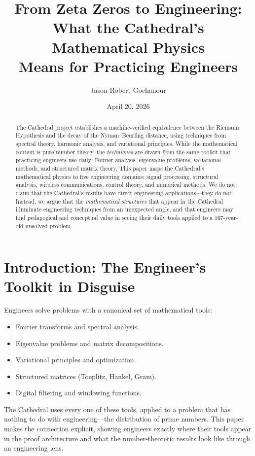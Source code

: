 \documentclass[11pt,a4paper]{article}
\title{%
  From Zeta Zeros to Engineering:\\
  What the Cathedral's Mathematical Physics\\
  Means for Practicing Engineers%
}
\author{
  Jason Robert Gochanour
}
\date{April 20, 2026}
\begin{document}
\maketitle

\begin{abstract}
The Cathedral project establishes a machine-verified equivalence
between the Riemann Hypothesis and the decay of the Nyman--Beurling
distance, using techniques from spectral theory, harmonic analysis,
and variational principles. While the mathematical content is pure
number theory, the \emph{techniques} are drawn from the same toolkit
that practicing engineers use daily: Fourier analysis, eigenvalue
problems, variational methods, and structured matrix theory. This
paper maps the Cathedral's mathematical physics to five engineering
domains: signal processing, structural analysis, wireless
communications, control theory, and numerical methods. We do not
claim that the Cathedral's results have direct engineering
applications---they do not. Instead, we argue that the
\emph{mathematical structures} that appear in the Cathedral
illuminate engineering techniques from an unexpected angle, and
that engineers may find pedagogical and conceptual value in seeing
their daily tools applied to a 167-year-old unsolved problem.
\end{abstract}

\tableofcontents

\section{Introduction: The Engineer's Toolkit in Disguise}

Engineers solve problems with a canonical set of mathematical tools:

\begin{itemize}
  \item Fourier transforms and spectral analysis.
  \item Eigenvalue problems and matrix decompositions.
  \item Variational principles and optimization.
  \item Structured matrices (Toeplitz, Hankel, Gram).
  \item Digital filtering and windowing functions.
\end{itemize}

The Cathedral uses every one of these tools, applied to a problem
that has nothing to do with engineering---the distribution of prime
numbers. This paper makes the connection explicit, showing engineers
exactly where their tools appear in the proof architecture and what
the number-theoretic results look like through an engineering lens.
\end{document}
